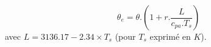 

\[
\theta_e = \theta .\left( 1 + r. \frac{L}{c_{pa}.T_s} \right) 
\]
avec $ L = 3136.17 - 2.34\times T_s $ (pour $T_s$ exprim\'e en $K$).\\
